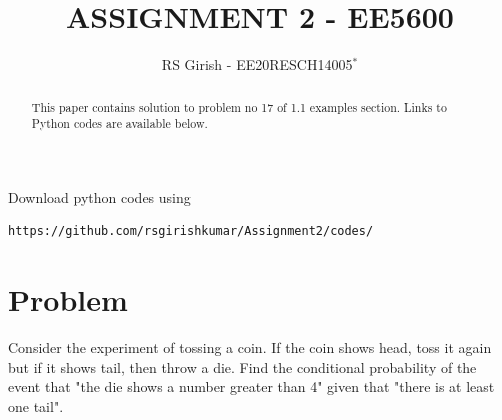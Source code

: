 \documentclass[journal,12pt,twocolumn]{IEEEtran}
\begin{document}
\def\putbox#1#2#3{\makebox[0in][l]{\makebox[#1][l]{}\raisebox{\baselineskip}[0in][0in]{\raisebox{#2}[0in][0in]{#3}}}}
     \def\rightbox#1{\makebox[0in][r]{#1}}
     \def\centbox#1{\makebox[0in]{#1}}
     \def\topbox#1{\raisebox{-\baselineskip}[0in][0in]{#1}}
     \def\midbox#1{\raisebox{-0.5\baselineskip}[0in][0in]{#1}}
\vspace{3cm}

\title{
ASSIGNMENT 2 - EE5600
	}
\author{ RS Girish - EE20RESCH14005$^{*}$%
	}	

\maketitle
\newpage
\tableofcontents
\bigskip
\renewcommand{\thefigure}{\theenumi}
\renewcommand{\thetable}{\theenumi}

\begin{abstract}
This paper contains solution to problem no 17 of 1.1 examples section.
Links to Python codes are available below.  
\end{abstract}
Download python codes using 
\begin{lstlisting}
https://github.com/rsgirishkumar/Assignment2/codes/
\end{lstlisting}
\section{Problem}
Consider the experiment of tossing a coin. If the coin shows head, toss it again but if it shows tail, then throw a die. Find the conditional probability of the event that "the die shows a number greater than 4" given that "there is at least one tail".\\
\end{document}
